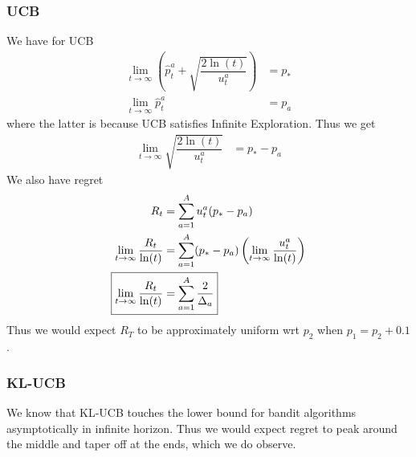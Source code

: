 \subsubsection*{UCB}
We have for UCB
\begin{align*}
    \lim_{t\rightarrow\infty} \left(\hat{p}_t^a + \sqrt{\dfrac{2\ln(t)}{u_t^a}}\right) &= p_* \\
    \lim_{t\rightarrow\infty} \hat{p}_t^a &= p_a
\end{align*}
where the latter is because UCB satisfies Infinite Exploration. Thus we get
\begin{align*}
    \lim_{t\rightarrow\infty}\sqrt{\dfrac{2\ln(t)}{u_t^a}} &= p_* - p_a
\end{align*}
We also have regret
\begin{align*}
    R_t &= \sum_{a=1}^A u_t^a(p_* - p_a) \\
    \lim_{t\rightarrow\infty} \dfrac{R_t}{\ln(t)} &= \sum_{a=1}^A (p_* - p_a) \left(\lim_{t\rightarrow\infty}\dfrac{u_t^a}{\ln(t)}\right) \\
    \Aboxed{\lim_{t\rightarrow\infty} \dfrac{R_t}{\ln(t)} &= \sum_{a=1}^A \dfrac{2}{\Delta_a}}
\end{align*}
Thus we would expect $R_T$ to be approximately uniform wrt $p_2$ when $p_1 = p_2 + 0.1$.
\subsubsection*{KL-UCB}
We know that KL-UCB touches the lower bound for bandit algorithms asymptotically in infinite horizon. Thus we would expect regret to peak around the middle and taper off at the ends, which we do observe.
